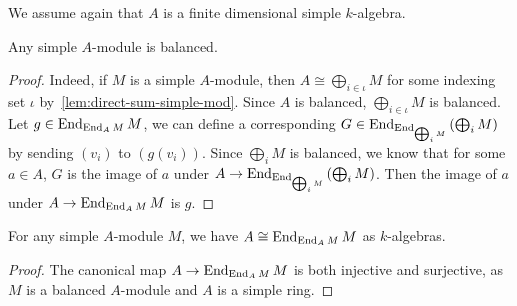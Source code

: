 We assume again that $A$ is a finite dimensional simple $k$-algebra.
\begin{lemma}
  Any simple $A$-module is balanced. \leanok {}
\end{lemma}
\begin{proof}
  Indeed, if $M$ is a simple $A$-module, then $A \cong \bigoplus_{i\in\iota} M$
  for some indexing set $\iota$ by~\cref{lem:direct-sum-simple-mod}. Since $A$
  is balanced, $\bigoplus_{i\in\iota}M$ is balanced. Let
  $g \in \operatorname{End}_{\operatorname{End}_{A}M}M$, we can define a corresponding
  $G \in \operatorname{End}_{\operatorname{End}_{\bigoplus_{i}M}}\left(\bigoplus_{i}M\right)$ by sending
  $(v_{i})$ to $(g(v_{i}))$. Since $\bigoplus_{i}M$ is balanced, we know that
  for some $a\in A$, $G$ is the image of $a$ under
  $A \to \operatorname{End}_{\operatorname{End}_{\bigoplus_{i}M}}\left(\bigoplus_{i}M\right)$. Then the
  image of $a$ under $A \to \operatorname{End}_{\operatorname{End}_{A}M}M$ is $g$.
\end{proof}

\begin{lemma}\label{lem:iso-end-end}
  For any simple $A$-module $M$, we have $A \cong \operatorname{End}_{\operatorname{End}_{A}M}M$ as
  $k$-algebras.
\end{lemma}
\begin{proof}
  The canonical map $A \to \operatorname{End}_{\operatorname{End}_{A}M}M$ is both injective and surjective,
  as $M$ is a balanced $A$-module and $A$ is a simple ring.
\end{proof}

